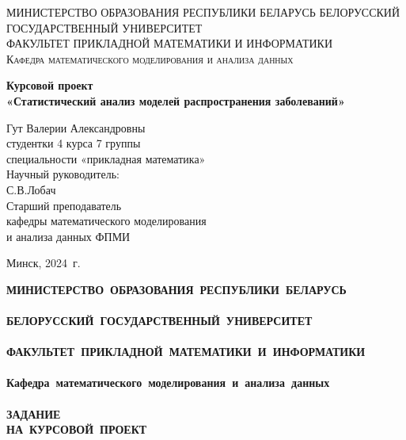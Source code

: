 \documentclass[a4paper, 14pt]{extreport}
\numberwithin{equation}{section}
\begin{document}
	\def\contentsname{ОГЛАВЛЕНИЕ}
	
	\begin{titlepage}
		\begin{center}
			\textsc{МИНИСТЕРСТВО ОБРАЗОВАНИЯ РЕСПУБЛИКИ БЕЛАРУСЬ БЕЛОРУССКИЙ ГОСУДАРСТВЕННЫЙ УНИВЕРСИТЕТ
				\\[5mm]
				ФАКУЛЬТЕТ ПРИКЛАДНОЙ МАТЕМАТИКИ И ИНФОРМАТИКИ\\[2mm]
				Кафедра математического моделирования и анализа данных
			}
			
			\vfill
			
			\textbf{Курсовой проект
				\\[3mm]
				«Статистический анализ моделей распространения заболеваний»
				\\[26mm]
			}
		\end{center}
		
		\hfill
		\begin{minipage}{.5\textwidth}
			\begin{flushright}
				Гут Валерии Александровны\\
				студентки 4 курса 7 группы\\
				специальности «прикладная математика»\\[5mm]
				
				Научный руководитель:\\[2mm] 
				С.В.Лобач\\
				Старший преподаватель\\
				кафедры математического моделирования\\
				и анализа данных ФПМИ
				
			\end{flushright}
		\end{minipage}%
		\vfill
		\begin{center}
			Минск, 2024\ г.
		\end{center}
	\end{titlepage}
	\newpage
	\setcounter{page}{2}
	\begin{center}
		\bf
		{
			\small\mbox{МИНИСТЕРСТВО~ОБРАЗОВАНИЯ~РЕСПУБЛИКИ~БЕЛАРУСЬ} \\~\\
			\mbox{БЕЛОРУССКИЙ~ГОСУДАРСТВЕННЫЙ~УНИВЕРСИТЕТ} \\~\\
			\mbox{ФАКУЛЬТЕТ~ПРИКЛАДНОЙ МАТЕМАТИКИ~И~ИНФОРМАТИКИ} \\~\\
			\mbox{Кафедра~математического~моделирования~и~анализа~данных} \\~\\[2mm]
		}
		\bf
		{
			\mbox{\small ЗАДАНИЕ}\\
			\mbox{\small НА КУРСОВОЙ ПРОЕКТ} \\[6mm]
		}
	\end{center}
\end{document}
